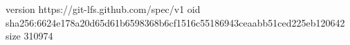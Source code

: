 version https://git-lfs.github.com/spec/v1
oid sha256:6624e178a20d65d61b6598368b6cf1516c55186943ceaabb51ced225eb120642
size 310974
